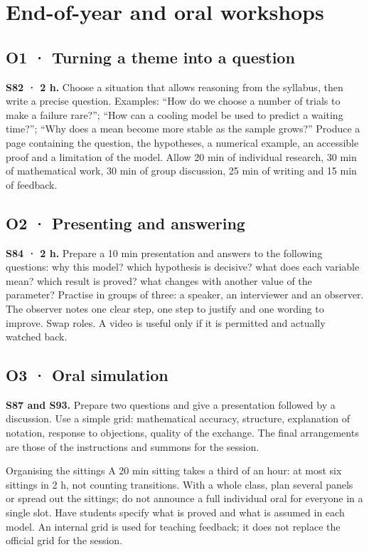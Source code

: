 \chapter{End-of-year and oral workshops}
\section{O1 · Turning a theme into a question}
\textbf{S82 · 2 h.} Choose a situation that allows reasoning from the syllabus, then write a precise question. Examples: ``How do we choose a number of trials to make a failure rare?''; ``How can a cooling model be used to predict a waiting time?''; ``Why does a mean become more stable as the sample grows?''
Produce a page containing the question, the hypotheses, a numerical example, an accessible proof and a limitation of the model. Allow 20 min of individual research, 30 min of mathematical work, 30 min of group discussion, 25 min of writing and 15 min of feedback.
\section{O2 · Presenting and answering}
\textbf{S84 · 2 h.} Prepare a 10 min presentation and answers to the following questions: why this model? which hypothesis is decisive? what does each variable mean? which result is proved? what changes with another value of the parameter?
Practise in groups of three: a speaker, an interviewer and an observer. The observer notes one clear step, one step to justify and one wording to improve. Swap roles. A video is useful only if it is permitted and actually watched back.
\section{O3 · Oral simulation}
\textbf{S87 and S93.} Prepare two questions and give a presentation followed by a discussion. Use a simple grid: mathematical accuracy, structure, explanation of notation, response to objections, quality of the exchange. The final arrangements are those of the instructions and summons for the session.
\ifprof\begin{profbox}{Organising the sittings}
A 20 min sitting takes a third of an hour: at most six sittings in 2 h, not counting transitions. With a whole class, plan several panels or spread out the sittings; do not announce a full individual oral for everyone in a single slot. Have students specify what is proved and what is assumed in each model. An internal grid is used for teaching feedback; it does not replace the official grid for the session.
\end{profbox}\fi
